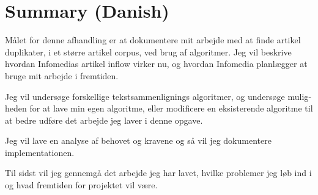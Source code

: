 \chapter{Summary (Danish)}
\begin{otherlanguage}{danish}

Målet for denne afhandling er at dokumentere mit arbejde med at finde artikel duplikater, i et større artikel corpus, ved brug af algoritmer. Jeg vil beskrive hvordan Infomedias artikel inflow virker nu, og hvordan Infomedia planlægger at bruge mit arbejde i fremtiden.

Jeg vil undersøge forskellige tekstsammenlignings algoritmer, og undersøge muligheden for at lave min egen algoritme, eller modificere en eksisterende algoritme til at bedre udføre det arbejde jeg laver i denne opgave.

Jeg vil lave en analyse af behovet og kravene og så vil jeg dokumentere implementationen.

Til sidst vil jeg gennemgå det arbejde jeg har lavet, hvilke problemer jeg løb ind i og hvad fremtiden for projektet vil være.

\end{otherlanguage}